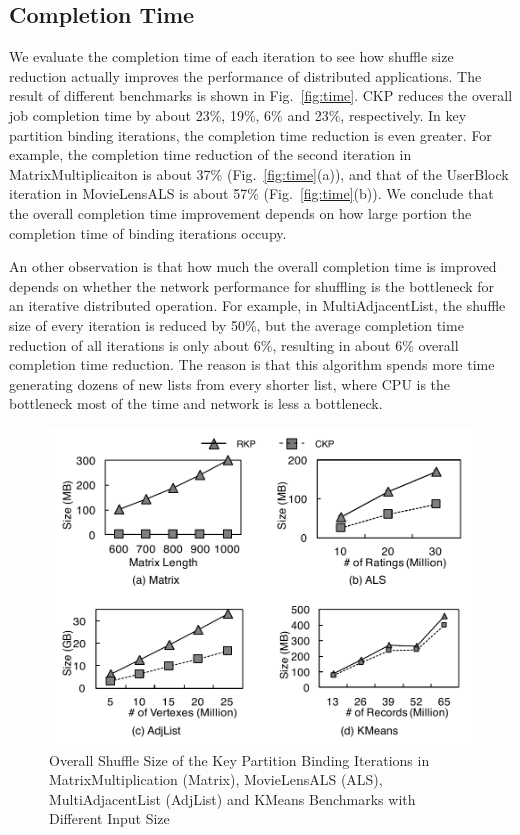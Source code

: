 \documentclass[10pt,journal,compsoc]{IEEEtran}
\begin{document}
\subsection{Completion Time}
We evaluate the completion time of each iteration to see how shuffle size 
reduction actually improves the performance of distributed applications. 
The result of different benchmarks is shown in Fig.~\ref{fig:time}. 
CKP reduces the overall job completion time by about 23\%, 19\%, 6\% and 23\%, 
respectively. 
In key partition binding iterations, the completion time reduction is even greater.  
For example, the completion time reduction of 
the second iteration in MatrixMultiplicaiton is about 37\% (Fig.~\ref{fig:time}(a)), 
and that of the UserBlock iteration in MovieLensALS is about 57\% (Fig.~\ref{fig:time}(b)). 
We conclude that the overall completion time improvement
depends on how large portion the completion time of binding iterations 
occupy. 

An other observation is that how much the overall completion time is improved 
depends on whether the network performance for shuffling is the bottleneck for 
an iterative distributed operation. For example, in MultiAdjacentList, the shuffle size of every iteration is reduced by 50\%, but the average completion time reduction of all iterations
is only about 6\%, resulting in about 6\% overall completion time reduction.
The reason is that this algorithm spends more time generating dozens of 
new lists from every shorter list, where CPU is the bottleneck most of the time
and network is less a bottleneck. 



\begin{figure}[!t]
\centering
\includegraphics[width=1\columnwidth]{figure7}
\caption{Overall Shuffle Size of the Key Partition 
Binding Iterations in MatrixMultiplication (Matrix), MovieLensALS (ALS), MultiAdjacentList (AdjList) and KMeans Benchmarks with Different Input Size}
\label{fig:sizeLine}
\end{figure}
\end{document}
